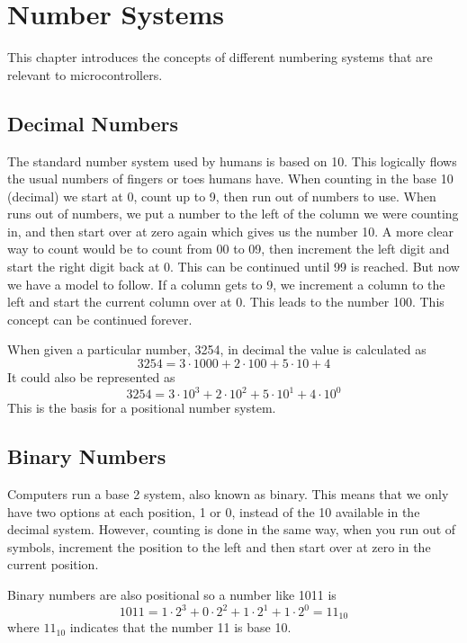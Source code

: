 \chapter{Number Systems}

This chapter introduces the concepts of different numbering systems that
are relevant to microcontrollers.

\section{Decimal Numbers}
The standard number system used by humans is based on 10. This logically flows 
the usual numbers of fingers or toes humans have. When counting in the base 10 (decimal) we 
start at 0, count up to 9, then run out of numbers 
to use. When runs out of numbers, we put a number to the left of the column we were counting
in, and then start over at zero again which gives us the number 10. A more clear way to count 
would be to count from 00 to 09, then increment the left digit and start the right digit back
at 0. This can be continued until 99 is reached. But now we have a model to follow. If a 
column gets to 9, we increment a column to the left and start the current column over at 0. 
This leads to the number 100. This concept can be continued forever.

When given a particular number, 3254, in decimal the value is calculated as
\begin{equation}
	3254 = 3\cdot1000 + 2\cdot100 + 5\cdot10 + 4
\end{equation}
It could also be represented as
\begin{equation}
	3254 = 3\cdot10^3 + 2\cdot10^2 + 5\cdot10^1 + 4\cdot10^0
\end{equation}
This is the basis for a positional number system.

\section{Binary Numbers}
Computers run a base 2 system, also known as binary. This means that we only have two options 
at each position, 1 or 0, instead of the 10 available in the decimal system. However, counting
is done in the same way, when you run out of symbols, increment the position to the left and 
then start over at zero in the current position.

Binary numbers are also positional so a number like 1011 is 
\begin{equation}
	1011 = 1\cdot2^3 + 0\cdot2^2 + 1\cdot2^1 + 1\cdot2^0 = 11_{10}
\end{equation}
where $11_{10}$ indicates that the number 11 is base 10.

